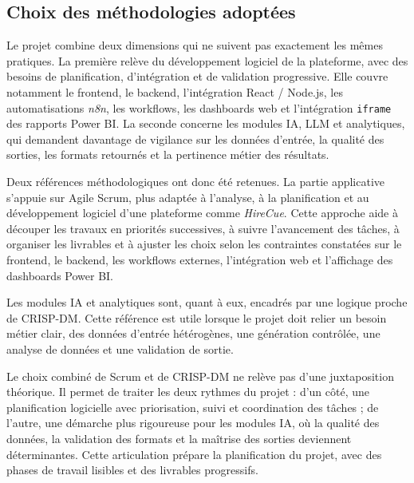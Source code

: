 \subsection{Choix des méthodologies adoptées}

Le projet combine deux dimensions qui ne suivent pas exactement les mêmes pratiques. La première relève du développement logiciel de la plateforme, avec des besoins de planification, d'intégration et de validation progressive. Elle couvre notamment le frontend, le backend, l'intégration React / Node.js, les automatisations \textit{n8n}, les workflows, les dashboards web et l'intégration \texttt{iframe} des rapports Power BI. La seconde concerne les modules IA, LLM et analytiques, qui demandent davantage de vigilance sur les données d'entrée, la qualité des sorties, les formats retournés et la pertinence métier des résultats.

Deux références méthodologiques ont donc été retenues. La partie applicative s'appuie sur Agile Scrum, plus adaptée à l'analyse, à la planification et au développement logiciel d'une plateforme comme \textit{HireCue}. Cette approche aide à découper les travaux en priorités successives, à suivre l'avancement des tâches, à organiser les livrables et à ajuster les choix selon les contraintes constatées sur le frontend, le backend, les workflows externes, l'intégration web et l'affichage des dashboards Power BI.

Les modules IA et analytiques sont, quant à eux, encadrés par une logique proche de CRISP-DM. Cette référence est utile lorsque le projet doit relier un besoin métier clair, des données d'entrée hétérogènes, une génération contrôlée, une analyse de données et une validation de sortie.

Le choix combiné de Scrum et de CRISP-DM ne relève pas d'une juxtaposition théorique. Il permet de traiter les deux rythmes du projet : d'un côté, une planification logicielle avec priorisation, suivi et coordination des tâches ; de l'autre, une démarche plus rigoureuse pour les modules IA, où la qualité des données, la validation des formats et la maîtrise des sorties deviennent déterminantes. Cette articulation prépare la planification du projet, avec des phases de travail lisibles et des livrables progressifs.

